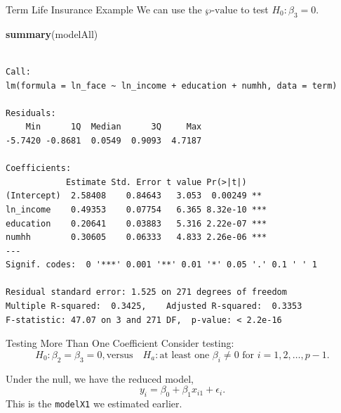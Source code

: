 \documentclass[
  ignorenonframetext,
]{beamer}
\newenvironment{Shaded}{\begin{snugshade}}{\end{snugshade}}
\newcommand{\FunctionTok}[1]{\textcolor[rgb]{0.13,0.29,0.53}{\textbf{#1}}}
\newcommand{\NormalTok}[1]{#1}
\begin{document}
\begin{frame}[fragile]{Term Life Insurance Example}
\label{term-life-insurance-example-3}
We can use the \(\wp\text{-value}\) to test \(H_0:\beta_3=0\).

\scriptsize

\begin{Shaded}
\begin{Highlighting}[]
\FunctionTok{summary}\NormalTok{(modelAll)}
\end{Highlighting}
\end{Shaded}

\begin{verbatim}

Call:
lm(formula = ln_face ~ ln_income + education + numhh, data = term)

Residuals:
    Min      1Q  Median      3Q     Max 
-5.7420 -0.8681  0.0549  0.9093  4.7187 

Coefficients:
            Estimate Std. Error t value Pr(>|t|)    
(Intercept)  2.58408    0.84643   3.053  0.00249 ** 
ln_income    0.49353    0.07754   6.365 8.32e-10 ***
education    0.20641    0.03883   5.316 2.22e-07 ***
numhh        0.30605    0.06333   4.833 2.26e-06 ***
---
Signif. codes:  0 '***' 0.001 '**' 0.01 '*' 0.05 '.' 0.1 ' ' 1

Residual standard error: 1.525 on 271 degrees of freedom
Multiple R-squared:  0.3425,    Adjusted R-squared:  0.3353 
F-statistic: 47.07 on 3 and 271 DF,  p-value: < 2.2e-16
\end{verbatim}

\normalsize
\end{frame}

\begin{frame}[fragile]{Testing More Than One Coefficient}
\label{testing-more-than-one-coefficient}
Consider testing:
\[H_0:\beta_2=\beta_3=0, \text{versus} \quad H_a: \text{at least one } \beta_i \neq 0 \text{ for } i = 1, 2, \ldots, p-1.\]

Under the null, we have the reduced model,
\[y_i=\beta_0+\beta_1 x_{i1}+\epsilon_i.\] This is the \texttt{modelX1}
we estimated earlier.
\end{frame}
\end{document}
